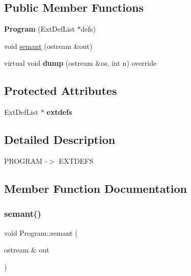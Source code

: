 \subsection*{Public Member Functions}
\begin{DoxyCompactItemize}
\item 
\mbox{\label{class_program_ab74fa81e40ae89ea91c6f14672526968}} 
{\bfseries Program} (Ext\+Def\+List $\ast$defs)
\item 
void \hyperlink{class_program_a1fec659a1de541b94b87e17cad84f5a2}{semant} (ostream \&out)
\item 
\mbox{\label{class_program_ab9a7906af6b6c07139fbf8c7cb44bdd1}} 
virtual void {\bfseries dump} (ostream \&os, int n) override
\end{DoxyCompactItemize}
\subsection*{Protected Attributes}
\begin{DoxyCompactItemize}
\item 
\mbox{\label{class_program_a41ddedf2d23da68ca6f74163334adc2c}} 
Ext\+Def\+List $\ast$ {\bfseries extdefs}
\end{DoxyCompactItemize}


\subsection{Detailed Description}
P\+R\+O\+G\+R\+AM -\/$>$ E\+X\+T\+D\+E\+FS 

\subsection{Member Function Documentation}
\mbox{\label{class_program_a1fec659a1de541b94b87e17cad84f5a2}} 
\subsubsection{\texorpdfstring{semant()}{semant()}}
{\footnotesize\ttfamily void Program\+::semant (\begin{DoxyParamCaption}\item[{ostream \&}]{out }\end{DoxyParamCaption})}



